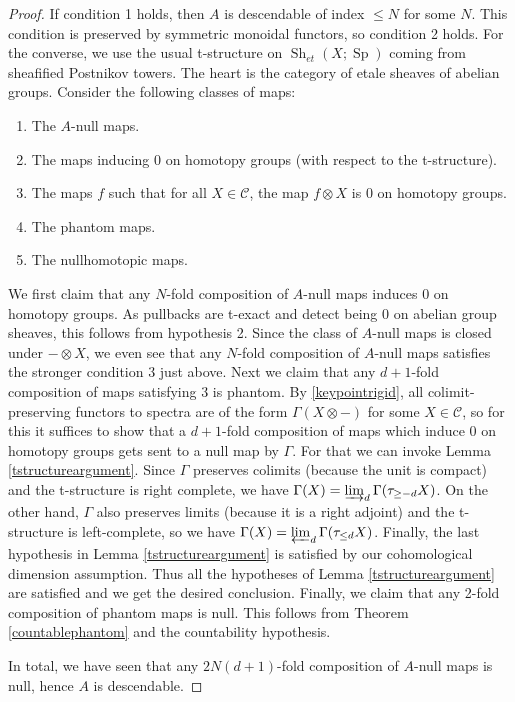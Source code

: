 \documentclass[12pt]{article}
\newcommand{\on}{\operatorname}
\begin{document}
\begin{proof}
If condition 1 holds, then $A$ is descendable of index $\leq N$ for some $N$.  This condition is preserved by symmetric monoidal functors, so condition 2 holds.  For the converse, we use the usual t-structure on $\on{Sh}_{et}(X;\on{Sp})$ coming from sheafified Postnikov towers.  The heart is the category of etale sheaves of abelian groups.  Consider the following classes of maps:
\begin{enumerate}
\item The $A$-null maps.
\item The maps inducing $0$ on homotopy groups (with respect to the t-structure).
\item The maps $f$ such that for all $X\in\mathcal{C}$, the map $f\otimes X$ is $0$ on homotopy groups.
\item The phantom maps.
\item The nullhomotopic maps.
\end{enumerate}
We first claim that any $N$-fold composition of $A$-null maps induces $0$ on homotopy groups.  As pullbacks are t-exact and detect being $0$ on abelian group sheaves, this follows from hypothesis 2.  Since the class of $A$-null maps is closed under $-\otimes X$, we even see that any $N$-fold composition of $A$-null maps satisfies the stronger condition 3 just above.  Next we claim that any $d+1$-fold composition of maps satisfying 3 is phantom.  By \ref{keypointrigid}, all colimit-preserving functors to spectra are of the form $\Gamma(X\otimes -)$ for some $X\in\mathcal{C}$, so for this it suffices to show that a $d+1$-fold composition of maps which induce $0$ on homotopy groups gets sent to a null map by $\Gamma$.  For that we can invoke Lemma \ref{tstructureargument}.  Since $\Gamma$ preserves colimits (because the unit is compact) and the t-structure is right complete, we have $\Gamma(X) = \varinjlim_d \Gamma(\tau_{\geq -d}X)$.  On the other hand, $\Gamma$ also preserves limits (because it is a right adjoint) and the t-structure is left-complete, so we have $\Gamma(X) = \varprojlim_d \Gamma(\tau_{\leq d}X)$.  Finally, the last hypothesis in Lemma \ref{tstructureargument} is satisfied by our cohomological dimension assumption.  Thus all the hypotheses of Lemma \ref{tstructureargument} are satisfied and we get the desired conclusion.  Finally, we claim that any 2-fold composition of phantom maps is null.  This follows from Theorem \ref{countablephantom} and the countability hypothesis.

In total, we have seen that any $2N(d+1)$-fold composition of $A$-null maps is null, hence $A$ is descendable.
\end{proof}
\end{document}
